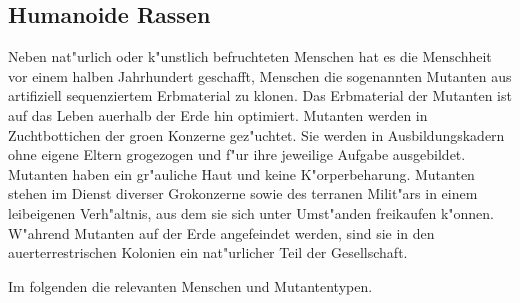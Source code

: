 \begin{appendices}

\section{Humanoide Rassen}

Neben nat"urlich oder k"unstlich befruchteten Menschen hat es die Menschheit vor einem halben Jahrhundert geschafft, Menschen die sogenannten Mutanten aus artifiziell sequenziertem Erbmaterial zu klonen. Das Erbmaterial der Mutanten ist auf das Leben au\3erhalb der Erde hin optimiert. Mutanten werden in Zuchtbottichen der gro\3en Konzerne gez"uchtet. Sie werden in Ausbildungskadern ohne eigene Eltern gro\3gezogen und f"ur ihre jeweilige Aufgabe ausgebildet. Mutanten haben ein gr"auliche Haut und keine K"orperbeharung. Mutanten stehen im Dienst diverser Gro\3konzerne sowie des terranen Milit"ars in einem leibeigenen Verh"altnis, aus dem sie sich unter Umst"anden freikaufen k"onnen. W"ahrend Mutanten auf der Erde angefeindet werden, sind sie in den au\3erterrestrischen Kolonien ein nat"urlicher Teil der Gesellschaft.

Im folgenden die relevanten Menschen und Mutantentypen.


\end{appendices}
